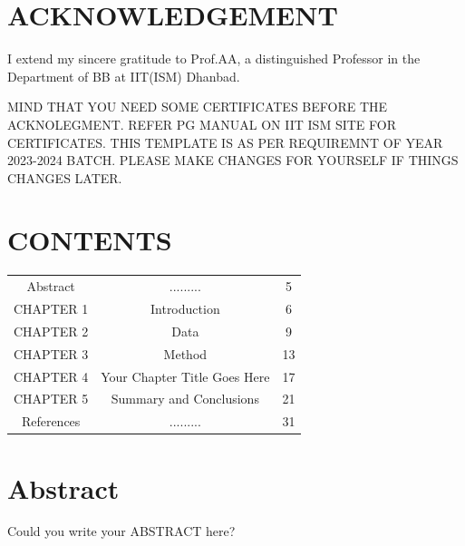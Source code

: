 \documentclass[12pt]{article}
\begin{document}

\newpage
\clearpage 
\setcounter{page}{1}  %


\section*{ACKNOWLEDGEMENT}
I extend my sincere gratitude to Prof.AA, a distinguished Professor in the Department of BB at IIT(ISM) Dhanbad. 

MIND THAT YOU NEED SOME CERTIFICATES BEFORE THE ACKNOLEGMENT. REFER PG MANUAL ON IIT ISM SITE FOR CERTIFICATES. 
THIS TEMPLATE IS AS PER REQUIREMNT OF YEAR 2023-2024 BATCH. PLEASE MAKE CHANGES FOR YOURSELF IF THINGS CHANGES LATER.


\newpage
\section*{CONTENTS}
\begin{tabular}{ccc}

 Abstract  &  .........                  &  5 \\
CHAPTER 1  & Introduction                &  6 \\
CHAPTER 2  &  Data                       &  9 \\
CHAPTER 3  & Method                      &  13 \\
CHAPTER 4  & Your Chapter Title Goes Here   &  17 \\
CHAPTER 5  &  Summary and Conclusions    &  21 \\
References & .........                   & 31

\end{tabular}

\newpage
\section*{}
\listoftables


\section*{}
\listoffigures

\newpage
\section*{Abstract}
Could you write your ABSTRACT here?
\end{document}

